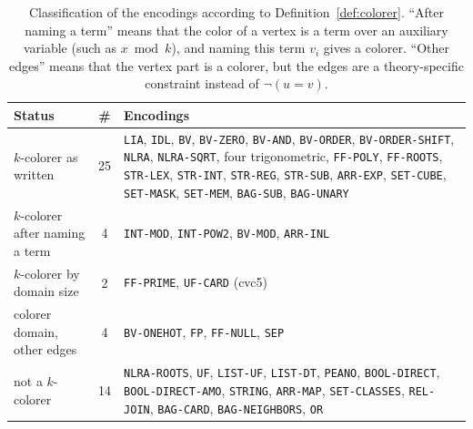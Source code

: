\documentclass[12pt,a4paper]{article}
\newcommand{\enc}[1]{\texttt{#1}}
\theoremstyle{definition}
\begin{document}
\begin{table}[t]
  \centering
  \small
  \begin{tabularx}{\textwidth}{@{}lcX@{}}
    \toprule
    Status & \# & Encodings \\
    \midrule
    $k$-colorer as written & 25 &
      \enc{LIA}, \enc{IDL}, \enc{BV}, \enc{BV-ZERO}, \enc{BV-AND},
      \enc{BV-ORDER}, \enc{BV-ORDER-SHIFT}, \enc{NLRA}, \enc{NLRA-SQRT}, four
      trigonometric, \enc{FF-POLY}, \enc{FF-ROOTS}, \enc{STR-LEX}, \enc{STR-INT},
      \enc{STR-REG}, \enc{STR-SUB}, \enc{ARR-EXP}, \enc{SET-CUBE},
      \enc{SET-MASK}, \enc{SET-MEM}, \enc{BAG-SUB}, \enc{BAG-UNARY} \\
    $k$-colorer after naming a term & 4 &
      \enc{INT-MOD}, \enc{INT-POW2}, \enc{BV-MOD}, \enc{ARR-INL} \\
    $k$-colorer by domain size & 2 &
      \enc{FF-PRIME}, \enc{UF-CARD} (cvc5) \\
    colorer domain, other edges & 4 &
      \enc{BV-ONEHOT}, \enc{FP}, \enc{FF-NULL}, \enc{SEP} \\
    not a $k$-colorer & 14 &
      \enc{NLRA-ROOTS}, \enc{UF}, \enc{LIST-UF}, \enc{LIST-DT}, \enc{PEANO},
      \enc{BOOL-DIRECT}, \enc{BOOL-DIRECT-AMO}, \enc{STRING}, \enc{ARR-MAP},
      \enc{SET-CLASSES}, \enc{REL-JOIN}, \enc{BAG-CARD}, \enc{BAG-NEIGHBORS},
      \enc{OR} \\
    \bottomrule
  \end{tabularx}
  \caption{Classification of the encodings according to
  Definition~\ref{def:colorer}. ``After naming a term'' means that the color of a
  vertex is a term over an auxiliary variable (such as $x \bmod k$), and naming
  this term $v_i$ gives a colorer. ``Other edges'' means that the vertex part is a
  colorer, but the edges are a theory-specific constraint instead of
  $\neg(u = v)$.}
  \label{tab:colorers}
\end{table}
\end{document}

